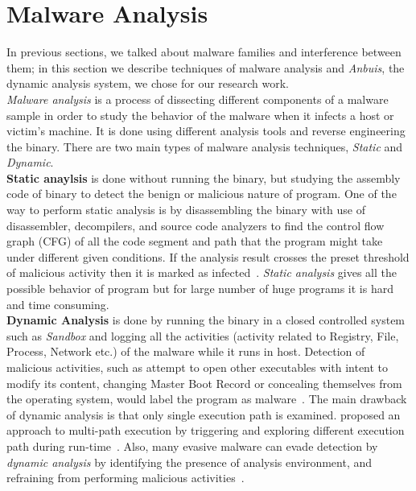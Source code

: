 \section{Malware Analysis}
\label{sec:Malware Analysis}
In previous sections, we talked about malware families and interference between them; in this section we describe techniques of malware analysis and \emph{Anbuis}, the dynamic analysis system, we chose for our research work.\\
\emph{Malware analysis} is a process of dissecting different components of a malware sample in order to study the behavior of the malware when it infects a host or victim's machine.
It is done using different analysis tools and reverse engineering the binary.
There are two main types of malware analysis techniques, \emph{Static} and \emph{Dynamic}.\\
\textbf{Static anaylsis} is done without running the binary, but studying the assembly code of binary to detect the benign or malicious nature of program.
One of the way to perform static analysis is by disassembling the binary with use of disassembler, decompilers, and source code analyzers to find the control flow graph (CFG) of all the code segment and path that the program might take under different given conditions.
If the analysis result crosses the preset threshold of malicious activity then it is marked as infected~\cite[]{sharma2014}.
\emph{Static analysis} gives all the possible behavior of program but for large number of huge programs it is hard and time consuming.\\
\textbf{Dynamic Analysis} is done by running the binary in a closed controlled system such as \emph{Sandbox} and logging all the activities (activity related to Registry, File, Process, Network etc.) of the malware while it runs in host.
Detection of malicious activities, such as attempt to open other executables with intent to modify its content, changing Master Boot Record or concealing themselves from the operating system, would label the program as malware~\cite[]{sharma2014}.
The main drawback of dynamic analysis is that only single execution path is examined.
\citeauthor{chipounov2012s2e} proposed an approach to multi-path execution by triggering and exploring different execution path during run-time~\cite[]{chipounov2012s2e}.
Also, many evasive malware can evade detection by \emph{dynamic analysis} by identifying the presence of analysis environment, and refraining from performing malicious activities~\cite[]{barecloud}.
\\
